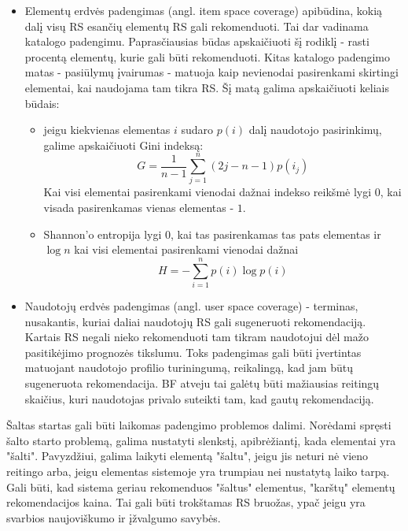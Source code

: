 \documentclass{VUMIFInfMagistrinis}
\begin{document}
\begin{itemize}
	\item Elementų erdvės padengimas (angl. item space coverage) apibūdina, kokią dalį visų RS esančių elementų RS gali rekomenduoti. Tai dar vadinama katalogo padengimu. Paprasčiausias būdas apskaičiuoti šį rodiklį - rasti procentą elementų, kurie gali būti rekomenduoti. Kitas katalogo padengimo matas - pasiūlymų įvairumas - matuoja kaip nevienodai pasirenkami skirtingi elementai, kai naudojama tam tikra RS. Šį matą galima apskaičiuoti keliais būdais:
	\begin{itemize}
		\item jeigu kiekvienas elementas $i$ sudaro $p(i)$ dalį naudotojo pasirinkimų, galime apskaičiuoti Gini indeksą:
		\begin{equation}
			G=\frac{1}{n-1} \sum\limits_{j=1}^{n} (2j-n-1)p(i_j)
		\end{equation}
		Kai visi elementai pasirenkami vienodai dažnai indekso reikšmė lygi $0$, kai visada pasirenkamas vienas elementas - $1$.
		\item Shannon'o entropija lygi 0, kai tas pasirenkamas tas pats elementas ir $\log n$ kai visi elementai pasirenkami vienodai dažnai
		\begin{equation}
			H= - \sum \limits_{i=1}^n p(i) \log p(i)
		\end{equation}
	\end{itemize}
	\item Naudotojų erdvės padengimas (angl. user space coverage) - terminas, nusakantis, kuriai daliai naudotojų RS gali sugeneruoti rekomendaciją. Kartais RS negali nieko rekomenduoti tam tikram naudotojui dėl mažo pasitikėjimo prognozės tikslumu. Toks padengimas gali būti įvertintas matuojant naudotojo profilio turiningumą, reikalingą, kad jam būtų sugeneruota rekomendacija. BF atveju tai galėtų būti mažiausias reitingų skaičius, kuri naudotojas privalo suteikti tam, kad gautų rekomendaciją.
\end{itemize}
Šaltas startas gali būti laikomas padengimo problemos dalimi. Norėdami spręsti šalto starto problemą, galima nustatyti slenkstį, apibrėžiantį, kada elementai yra "šalti". Pavyzdžiui, galima laikyti elementą "šaltu", jeigu jis neturi nė vieno reitingo arba, jeigu elementas sistemoje yra trumpiau nei nustatytą laiko tarpą.
\newline
\indent
Gali būti, kad sistema geriau rekomenduos "šaltus" elementus, "karštų" elementų rekomendacijos kaina. Tai gali būti trokštamas RS bruožas, ypač jeigu yra svarbios naujoviškumo ir įžvalgumo savybės.
\end{document}
